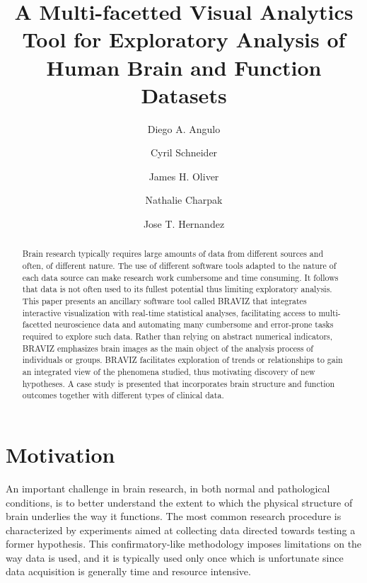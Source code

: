 \documentclass[twocolumn]{svjour3}
\begin{document}
\title{A Multi-facetted Visual Analytics Tool for Exploratory Analysis of Human Brain and Function Datasets} 

\author{Diego A. Angulo \and Cyril Schneider \and James H. Oliver  \and Nathalie Charpak \and Jose T. Hernandez}



\maketitle


\begin{abstract}
Brain research typically requires large amounts of data from different sources and often, of different nature. The use of different software tools adapted to the nature of each data source can make research work cumbersome and time consuming. It follows that data is not often used to its fullest potential thus limiting exploratory analysis. This paper presents an ancillary software tool called BRAVIZ that integrates interactive visualization with real-time statistical analyses, facilitating access to multi-facetted neuroscience data and automating many cumbersome and error-prone tasks required to explore such data. Rather than relying on abstract numerical indicators, BRAVIZ emphasizes brain images as the main object of the analysis process of individuals or groups. BRAVIZ facilitates exploration of trends or relationships to gain an integrated view of the phenomena studied, thus motivating discovery of new hypotheses. A case study is presented that incorporates brain structure and function outcomes together with different types of clinical data.

\end{abstract}

\section{Motivation}


An important challenge in brain research, in both normal and pathological conditions, is to better understand the extent to which the physical structure of brain underlies the way it functions. The most common research procedure is characterized by experiments aimed at collecting data directed towards testing a former hypothesis. This confirmatory-like methodology imposes limitations on the way data is used, and it is typically used only once which is unfortunate since data acquisition is generally time and resource intensive.
\end{document}
